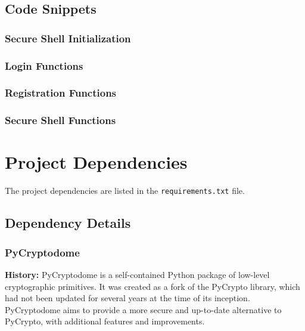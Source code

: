 \documentclass[12pt]{article}
\begin{document}
\subsection{Code Snippets}
\subsubsection{Secure Shell Initialization}


\subsubsection{Login Functions}


\subsubsection{Registration Functions}


\subsubsection{Secure Shell Functions}


\newpage

\section{Project Dependencies}
The project dependencies are listed in the \texttt{requirements.txt} file.



\subsection{Dependency Details}

\subsubsection{PyCryptodome}
\textbf{History:} PyCryptodome is a self-contained Python package of low-level cryptographic primitives. It was created as a fork of the PyCrypto library, which had not been updated for several years at the time of its inception. PyCryptodome aims to provide a more secure and up-to-date alternative to PyCrypto, with additional features and improvements.
\end{document}

